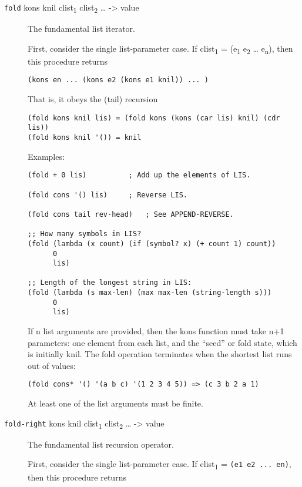 \begin{description}
\item[ \href{}{} \texttt{fold} kons knil clist\textsubscript{1}
clist\textsubscript{2} \ldots{} -\textgreater{} value ]
The fundamental list iterator.

First, consider the single list-parameter case. If
clist\textsubscript{1} = (e\textsubscript{1} e\textsubscript{2} \ldots{}
e\textsubscript{n}), then this procedure returns

\texttt{(kons\ en\ ...\ (kons\ e2\ (kons\ e1\ knil))\ ...\ )}

That is, it obeys the (tail) recursion

\begin{verbatim}
(fold kons knil lis) = (fold kons (kons (car lis) knil) (cdr lis))
(fold kons knil '()) = knil
\end{verbatim}

Examples:

\begin{verbatim}
(fold + 0 lis)          ; Add up the elements of LIS.

(fold cons '() lis)     ; Reverse LIS.

(fold cons tail rev-head)   ; See APPEND-REVERSE.

;; How many symbols in LIS?
(fold (lambda (x count) (if (symbol? x) (+ count 1) count))
      0
      lis)

;; Length of the longest string in LIS:
(fold (lambda (s max-len) (max max-len (string-length s)))
      0
      lis)
\end{verbatim}

If n list arguments are provided, then the kons function must take n+1
parameters: one element from each list, and the ``seed'' or fold state,
which is initially knil. The fold operation terminates when the shortest
list runs out of values:

\begin{verbatim}
(fold cons* '() '(a b c) '(1 2 3 4 5)) => (c 3 b 2 a 1)
\end{verbatim}

At least one of the list arguments must be finite.
\item[ \href{}{} \texttt{fold-right} kons knil clist\textsubscript{1}
clist\textsubscript{2} \ldots{} -\textgreater{} value ]
The fundamental list recursion operator.

First, consider the single list-parameter case. If
clist\textsubscript{1} = \texttt{(e1\ e2\ ...\ en)}, then this procedure
returns


\end{description}
